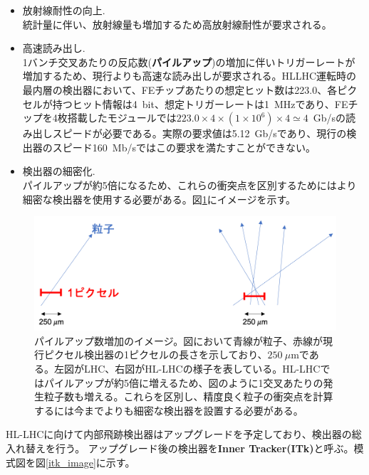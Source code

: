 \begin{itemize}
  \item 放射線耐性の向上.\\
  統計量に伴い、放射線量も増加するため高放射線耐性が要求される。
  \item 高速読み出し.\\
  1バンチ交叉あたりの反応数(\textbf{パイルアップ})の増加に伴いトリガーレートが増加するため、現行よりも高速な読み出しが要求される。HLLHC運転時の最内層の検出器において、FEチップあたりの想定ヒット数は223.0、各ピクセルが持つヒット情報は4~bit、想定トリガーレートは1~MHzであり、FEチップを4枚搭載したモジュールでは$223.0\times 4 \times (1\times 10^6) \times 4 \simeq 4$~Gb/sの読み出しスピードが必要である。実際の要求値は5.12~Gb/sであり、現行の検出器のスピード160~Mb/sではこの要求を満たすことができない。
  \item 検出器の細密化.\\
  パイルアップが約5倍になるため、これらの衝突点を区別するためにはより細密な検出器を使用する必要がある。図\ref{detector_posi_res}にイメージを示す。
\end{itemize}

\begin{figure}[bpt]\centering
\includegraphics[width=12cm]{./detector_posi_res.png}
\caption[パイルアップ数増加のイメージ]{パイルアップ数増加のイメージ。図において青線が粒子、赤線が現行ピクセル検出器の1ピクセルの長さを示しており、$250~\mu$mである。左図がLHC、右図がHL-LHCの様子を表している。HL-LHCではパイルアップが約5倍に増えるため、図のように1交叉あたりの発生粒子数も増える。これらを区別し、精度良く粒子の衝突点を計算するには今までよりも細密な検出器を設置する必要がある。}
\label{detector_posi_res}
\end{figure}

HL-LHCに向けて内部飛跡検出器はアップグレードを予定しており、検出器の総入れ替えを行う。
アップグレード後の検出器を\textbf{Inner Tracker(ITk)}と呼ぶ。模式図を図\ref{itk_image}に示す。

